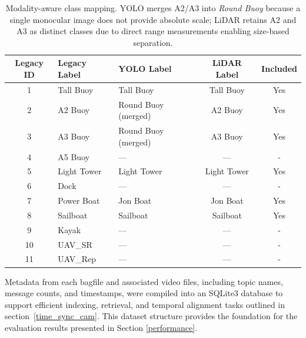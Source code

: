 \documentclass{erauthesis}
\begin{document}
\begin{table}[ht]
\centering
\begin{tabular}{cllcc}
\hline
Legacy ID & Legacy Label & YOLO Label & LiDAR Label  & Included \\
\hline
1  & Tall Buoy          & Tall Buoy              & Tall Buoy          & Yes \\
2  & A2 Buoy            & Round Buoy (merged)    & A2 Buoy            & Yes \\
3  & A3 Buoy            & Round Buoy (merged)    & A3 Buoy            & Yes \\
4  & A5  Buoy           & —                      & —                  & - \\
5  & Light Tower        & Light Tower            & Light Tower        & Yes \\
6  & Dock               & —                      & —                  & - \\
7  & Power Boat         & Jon Boat               & Jon Boat           & Yes \\
8  & Sailboat           & Sailboat               & Sailboat           & Yes \\
9  & Kayak              & —                      & —                  & - \\
10 & UAV\_SR    & —                      & —                  & - \\
11 & UAV\_Rep   & —                      & —                  & - \\
\hline
\end{tabular}
\caption{Modality-aware class mapping. YOLO merges A2/A3 into \emph{Round Buoy} because a single monocular image does not provide absolute scale; LiDAR retains A2 and A3 as distinct classes due to direct range measurements enabling size-based separation.}
\label{tab:class_map}
\end{table}

Metadata from each bagfile and associated video files, including topic names, message counts, and timestamps, were compiled into an SQLite3 database to support efficient indexing, retrieval, and temporal alignment tasks outlined in section~\ref{time_sync_cam}.
This dataset structure provides the foundation for the evaluation results presented in Section \ref{performance}. 

\end{document}
